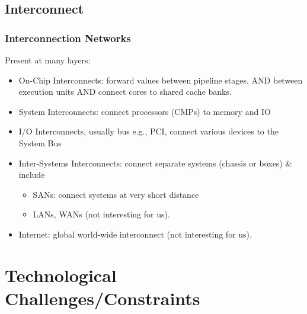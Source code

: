 \documentclass{beamer}
\renewcommand{\emph}[1]{\textcolor{structure}{#1}}
\newcommand{\emp}[1]{\textcolor{DikuRed}{ #1}}
\begin{document}
\subsection{Interconnect}
\begin{frame}[fragile,t]
\frametitle{Interconnection Networks}

Present at many layers:
\begin{itemize}
            \item \emp{On-Chip Interconnects:} forward values between pipeline stages, AND between execution units AND connect cores to shared cache banks. \smallskip

            \item \emp{System Interconnects:} connect processors (CMPs) to memory and IO

            \item \emp{I/O Interconnects}, usually bus e.g., PCI, connect various 
                    devices to the System Bus
            \item \emp{Inter-Systems Interconnects:} connect separate systems (chassis or boxes) \& include
                \begin{itemize}
                    \item \emph{SANs:} connect systems at very short distance
                    \item LANs, WANs (not interesting for us).
                \end  {itemize}

            \item Internet: global world-wide interconnect (not interesting for us).
\end  {itemize}

\end{frame}


\section{Technological Challenges/Constraints}

\begin{frame}[fragile]
	\tableofcontents[currentsection]
\end{frame}
\end{document}

